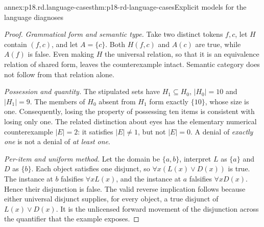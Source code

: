 \begin{annexitem}{annex:p18.rd.language-cases}{thm:p18-rd-language-cases}{Explicit models for the language diagnoses}
\begin{proof}
\emph{Grammatical form and semantic type.} Take two distinct tokens
\(f,c\), let \(H\) contain \((f,c)\), and let
\(A=\{c\}\). Both \(H(f,c)\) and \(A(c)\) are true,
while \(A(f)\) is false. Even making \(H\) the universal
relation, so that it is an equivalence relation of shared form, leaves
the counterexample intact. Semantic category does not follow from
that relation alone.

\emph{Possession and quantity.} The stipulated sets have
\(H_1\subseteq H_0\), \(|H_0|=10\) and \(|H_1|=9\).
The members of \(H_0\) absent from \(H_1\) form exactly
\(\{10\}\), whose size is one. Consequently, losing the
property of possessing ten items is consistent with losing only one.
The related distinction about eyes has the elementary numerical
counterexample \(|E|=2\): it satisfies \(|E|\ne1\), but
not \(|E|=0\). A denial of \emph{exactly one} is not a
denial of \emph{at least one}.

\emph{Per-item and uniform method.} Let the domain be
\(\{a,b\}\), interpret \(L\) as \(\{a\}\) and
\(D\) as \(\{b\}\). Each object satisfies one disjunct,
so \(\forall x(L(x)\lor D(x))\) is true. The instance at
\(b\) falsifies \(\forall xL(x)\), and the instance at
\(a\) falsifies \(\forall xD(x)\). Hence their disjunction
is false. The valid reverse implication follows because either
universal disjunct supplies, for every object, a true disjunct of
\(L(x)\lor D(x)\). It is the unlicensed forward movement
of the disjunction across the quantifier that the example exposes.
\end{proof}
\end{annexitem}

